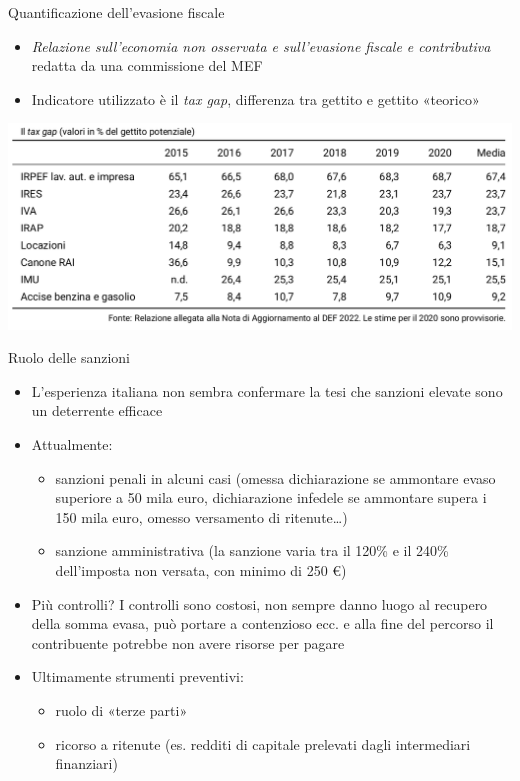 \documentclass[aspectratio=64,11pt]{beamer}
\begin{document}
\begin{frame}{Quantificazione dell'evasione fiscale}
\begin{itemize}
\item \emph{Relazione sull'economia non osservata e sull'evasione fiscale e
contributiva} redatta da una commissione del MEF
\item Indicatore utilizzato è il \emph{tax gap}, differenza tra gettito e gettito
«teorico»
\end{itemize}

\begin{center}
\includegraphics[width=.9\linewidth]{./figure/tax-gap.png}
\end{center}  
\end{frame}

\begin{frame}{Ruolo delle sanzioni}
\begin{itemize}
\item L'esperienza italiana non sembra confermare la tesi che sanzioni elevate
sono un deterrente efficace
\item Attualmente:
\begin{itemize}
\item sanzioni penali in alcuni casi (omessa dichiarazione se ammontare evaso
superiore a 50 mila euro, dichiarazione infedele se ammontare supera i 150
mila euro, omesso versamento di ritenute\ldots{})
\item sanzione amministrativa (la sanzione varia tra il 120\% e il 240\%
dell'imposta non versata, con minimo di 250 €)
\end{itemize}
\item Più controlli? I controlli sono costosi, non sempre danno luogo al recupero
della somma evasa, può portare a contenzioso ecc. e alla fine del percorso
il contribuente potrebbe non avere risorse per pagare
\item Ultimamente strumenti preventivi:
\begin{itemize}
\item ruolo di «terze parti»
\item ricorso a ritenute (es. redditi di capitale prelevati dagli intermediari
finanziari)
\end{itemize}
\end{itemize}
\end{frame}
\end{document}
